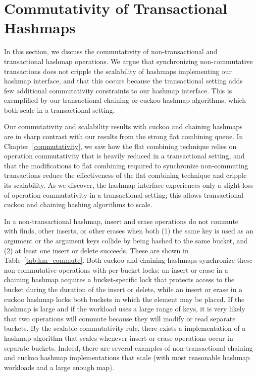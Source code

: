 \section{Commutativity of Transactional Hashmaps}
\label{hm_deps}

In this section, we discuss the commutativity of non-transactional and transactional hashmap operations. We argue that synchronizing non-commutative transactions does not cripple the scalability of hashmaps implementing our hashmap interface, and that this occurs because the transactional setting adds few additional commutativity constraints to our hashmap interface. This is exemplified by our transactional chaining or cuckoo hashmap algorithms, which both scale in a transactional setting. 

Our commutativity and scalability results with cuckoo and chaining hashmaps are in sharp contrast with our results from the strong flat combining queue. In Chapter~\ref{commutativity}, we saw how the flat combining technique relies on operation commutativity that is heavily reduced in a transactional setting, and that the modifications to flat combining required to synchronize non-commuting transactions reduce the effectiveness of the flat combining technique and cripple its scalability. 
As we discover, the hashmap interface experiences only a slight loss of operation commutativity in a transactional setting; this allows transactional cuckoo and chaining hashing algorithms to scale.

In a non-transactional hashmap, insert and erase operations do not commute with finds, other inserts, or other erases when both (1) the same key is used as an argument or the argument keys collide by being hashed to the same bucket, and (2) at least one insert or delete succeeds.
    These are shown in Table~\ref{tab:hm_commute}. Both cuckoo and chaining hashmaps synchronize these non-commutative operations with per-bucket locks: an insert or erase in a chaining hashmap acquires a bucket-specific lock that protects access to the bucket during the duration of the insert or delete, while an insert or erase in a cuckoo hashmap locks both buckets in which the element may be placed. If the hashmap is large and if the workload uses a large range of keys, it is very likely that two operations will commute because they will modify or read separate buckets.
By the scalable commutativity rule, there exists a implementation of a hashmap algorithm that scales whenever insert or erase operations occur in separate buckets. Indeed, there are several examples of non-transactional chaining and cuckoo hashmap implementations that scale (with most reasonable hashmap workloads and a large enough map).

